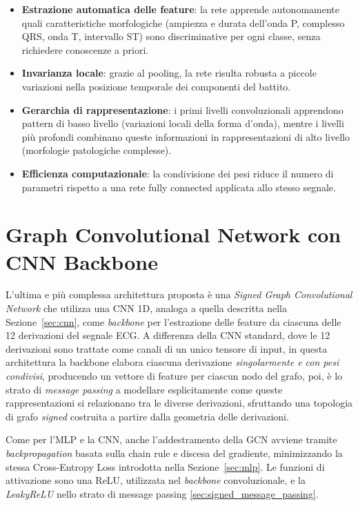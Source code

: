 \begin{itemize}
	\item \textbf{Estrazione automatica delle feature}: la rete apprende autonomamente quali caratteristiche morfologiche (ampiezza e durata dell'onda P, complesso QRS, onda T, intervallo ST) sono discriminative per ogni classe, senza richiedere conoscenze a priori.
	
	\item \textbf{Invarianza locale}: grazie al pooling, la rete risulta robusta a piccole variazioni nella posizione temporale dei componenti del battito.
	
	\item \textbf{Gerarchia di rappresentazione}: i primi livelli convoluzionali apprendono pattern di basso livello (variazioni locali della forma d'onda), mentre i livelli più profondi combinano queste informazioni in rappresentazioni di alto livello (morfologie patologiche complesse).
	
	\item \textbf{Efficienza computazionale}: la condivisione dei pesi riduce il numero di parametri rispetto a una rete fully connected applicata allo stesso segnale.
\end{itemize}

\section{Graph Convolutional Network con CNN Backbone}
\label{sec:gcn}

L'ultima e più complessa architettura proposta è una \emph{Signed Graph Convolutional Network} che utilizza una CNN 1D, analoga a quella descritta nella Sezione~\ref{sec:cnn}, come \emph{backbone} per l'estrazione delle feature da ciascuna delle 12 derivazioni del segnale ECG. A differenza della CNN standard, dove le 12 derivazioni sono trattate come canali di un unico tensore di input, in questa architettura la backbone elabora ciascuna derivazione \emph{singolarmente e con pesi condivisi}, producendo un vettore di feature per ciascun nodo del grafo, poi, è lo strato di \textit{message passing} \cite{kipfwelling2017} a modellare esplicitamente come queste rappresentazioni si relazionano tra le diverse derivazioni, sfruttando una topologia di grafo \emph{signed} \cite{derr2018signed} costruita a partire dalla geometria delle derivazioni.

Come per l'MLP e la CNN, anche l'addestramento della GCN avviene tramite \emph{backpropagation} basata sulla chain rule e discesa del gradiente, minimizzando la stessa Cross-Entropy Loss introdotta nella Sezione~\ref{sec:mlp}. Le funzioni di attivazione sono una ReLU, utilizzata nel \emph{backbone} convoluzionale, e la \emph{LeakyReLU} \cite{maas2013rectifier} nello strato di message passing \ref{sec:signed_message_passing}.

